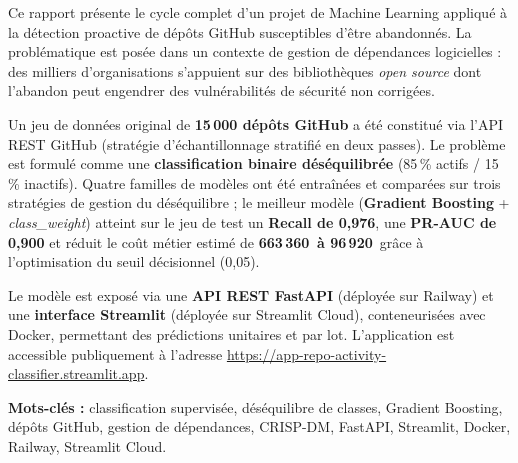 \documentclass[12pt,a4paper]{article}
\begin{document}
\begin{keybox}[Abstract]
Ce rapport présente le cycle complet d'un projet de Machine Learning appliqué à la détection proactive de
dépôts GitHub susceptibles d'être abandonnés. La problématique est posée dans un contexte de gestion de
dépendances logicielles : des milliers d'organisations s'appuient sur des bibliothèques \textit{open source}
dont l'abandon peut engendrer des vulnérabilités de sécurité non corrigées.

Un jeu de données original de \textbf{15\,000 dépôts GitHub} a été constitué via l'API REST GitHub
(stratégie d'échantillonnage stratifié en deux passes). Le problème est formulé comme une \textbf{classification
binaire déséquilibrée} (85\,\% actifs / 15\,\% inactifs). Quatre familles de modèles ont été entraînées et
comparées sur trois stratégies de gestion du déséquilibre ; le meilleur modèle (\textbf{Gradient Boosting}
+ \textit{class\_weight}) atteint sur le jeu de test un \textbf{Recall de 0,976}, une \textbf{PR-AUC de 0,900}
et réduit le coût métier estimé de \textbf{663\,360\,\texteuro{} à 96\,920\,\texteuro{}} grâce à
l'optimisation du seuil décisionnel (0,05).

Le modèle est exposé via une \textbf{API REST FastAPI} (déployée sur Railway) et une
\textbf{interface Streamlit} (déployée sur Streamlit Cloud), conteneurisées avec Docker,
permettant des prédictions unitaires et par lot. L'application est accessible publiquement
à l'adresse \url{https://app-repo-activity-classifier.streamlit.app}.
\end{keybox}

\vspace{0.5cm}
\noindent\textbf{Mots-clés :} classification supervisée, déséquilibre de classes, Gradient Boosting,
dépôts GitHub, gestion de dépendances, CRISP-DM, FastAPI, Streamlit, Docker, Railway, Streamlit Cloud.

\newpage
\tableofcontents

\newpage
\listoffigures
\listoftables

\newpage

\end{document}
